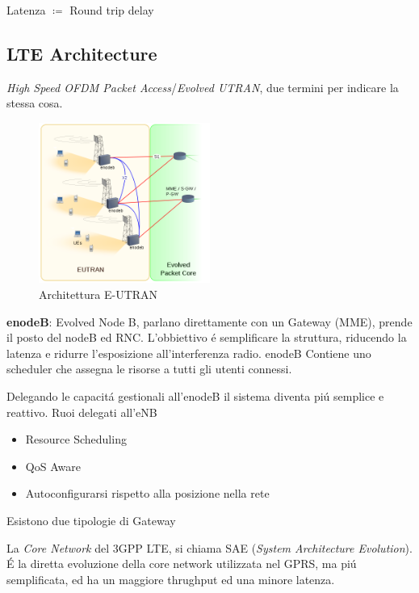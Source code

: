 \documentclass{article}
\begin{document}
Latenza $\coloneqq$ Round trip delay

\subsection{LTE Architecture}
\textit{High Speed OFDM Packet Access}/\textit{Evolved UTRAN}, due termini per indicare la stessa cosa.
\begin{figure}[h]
    \includegraphics[width=0.5\textwidth]{img/sdt/eutran}
    \centering
    \caption{Architettura E-UTRAN}
    \label{fig:lte_architecture}
\end{figure}


\textbf{enodeB}: Evolved Node B, parlano direttamente con un Gateway (MME), prende il posto del nodeB ed RNC. L'obbiettivo \'e semplificare la struttura, riducendo la latenza e ridurre l'esposizione all'interferenza radio.
enodeB Contiene uno scheduler che assegna le risorse a tutti gli utenti connessi.

Delegando le capacit\'a gestionali all'enodeB il sistema diventa pi\'u semplice e reattivo.
Ruoi delegati all'eNB
\begin{itemize}
    \item Resource Scheduling
    \item QoS Aware
    \item Autoconfigurarsi rispetto alla posizione nella rete
\end{itemize}

Esistono due tipologie di Gateway

La \textit{Core Network} del 3GPP LTE, si chiama SAE (\textit{System Architecture Evolution}).
\'E la diretta evoluzione della core network utilizzata nel GPRS, ma pi\'u semplificata, ed ha un maggiore thrughput ed una minore latenza.
\end{document}
